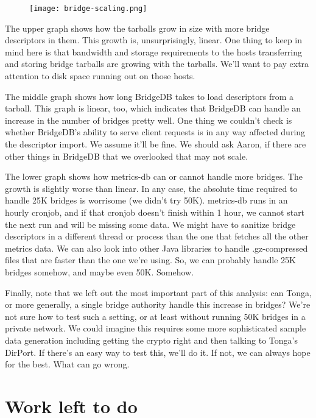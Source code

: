 \documentclass{article}
\begin{document}
\begin{figure}[t]
\texttt{[image: bridge-scaling.png]}
\label{fig:bridgescaling}
\end{figure}

The upper graph shows how the tarballs grow in size with more bridge
descriptors in them.
This growth is, unsurprisingly, linear.
One thing to keep in mind here is that bandwidth and storage requirements
to the hosts transferring and storing bridge tarballs are growing with the
tarballs.
We'll want to pay extra attention to disk space running out on those
hosts.

The middle graph shows how long BridgeDB takes to load descriptors from a
tarball.
This graph is linear, too, which indicates that BridgeDB can handle an
increase in the number of bridges pretty well.
One thing we couldn't check is whether BridgeDB's ability to serve client
requests is in any way affected during the descriptor import.
We assume it'll be fine.
We should ask Aaron, if there are other things in BridgeDB that we
overlooked that may not scale.

The lower graph shows how metrics-db can or cannot handle more bridges.
The growth is slightly worse than linear.
In any case, the absolute time required to handle 25K bridges is worrisome
(we didn't try 50K).
metrics-db runs in an hourly cronjob, and if that cronjob doesn't finish
within 1 hour, we cannot start the next run and will be missing some data.
We might have to sanitize bridge descriptors in a different thread or
process than the one that fetches all the other metrics data.
We can also look into other Java libraries to handle .gz-compressed files
that are faster than the one we're using.
So, we can probably handle 25K bridges somehow, and maybe even 50K.
Somehow.

Finally, note that we left out the most important part of this analysis:
can Tonga, or more generally, a single bridge authority handle this
increase in bridges?
We're not sure how to test such a setting, or at least without running 50K
bridges in a private network.
We could imagine this requires some more sophisticated sample data
generation including getting the crypto right and then talking to Tonga's
DirPort.
If there's an easy way to test this, we'll do it.
If not, we can always hope for the best.
What can go wrong.

\section{Work left to do}
\end{document}
